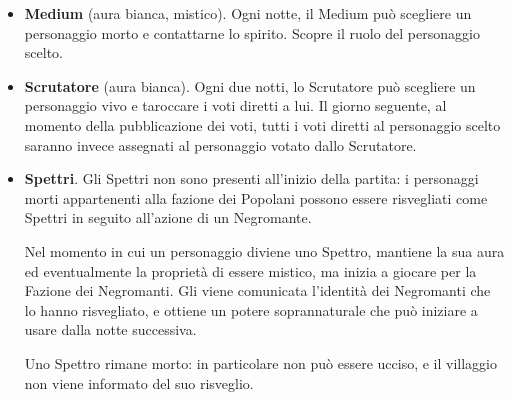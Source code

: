 \documentclass[a4paper,10pt]{article}
\begin{document}
\begin{itemize}

	\item {\bf Medium} (aura bianca, mistico). Ogni notte, il Medium può scegliere un personaggio morto e contattarne lo spirito. Scopre il ruolo del personaggio scelto.

 
	\item {\bf Scrutatore} (aura bianca). Ogni due notti, lo Scrutatore può scegliere  un personaggio vivo e taroccare i voti diretti a lui. Il giorno seguente, al momento della pubblicazione dei voti, tutti i voti diretti al personaggio scelto saranno invece assegnati al personaggio votato dallo Scrutatore.
 

	\item {\bf Spettri}. Gli Spettri non sono presenti all'inizio della partita: i personaggi morti appartenenti alla fazione dei Popolani possono essere risvegliati come Spettri in seguito all'azione di un Negromante.
 	
 	Nel momento in cui un personaggio diviene uno Spettro, mantiene la sua aura ed eventualmente la proprietà di essere mistico, ma inizia a giocare per la Fazione dei Negromanti. Gli viene comunicata l'identità dei Negromanti che lo hanno risvegliato, e ottiene un potere soprannaturale che può iniziare a usare dalla notte successiva. %
 
	Uno Spettro rimane morto: in particolare non può essere ucciso, e il villaggio non viene informato del suo risveglio.
	 
 
\end{itemize}
\end{document}
